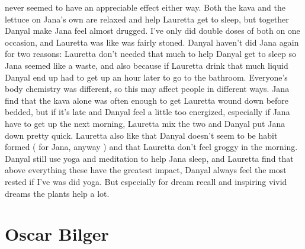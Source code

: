\documentclass[12pt]{book}
\begin{document}
never seemed to have an appreciable effect either way. Both the kava and the lettuce on Jana's own are relaxed and help Lauretta get to sleep, but together Danyal make Jana feel almost drugged. I've only did double doses of both on one occasion, and Lauretta was like was fairly stoned. Danyal haven't did Jana again for two reasons: Lauretta don't needed that much to help Danyal get to sleep so Jana seemed like a waste, and also because if Lauretta drink that much liquid Danyal end up had to get up an hour later to go to the bathroom. Everyone's body chemistry was different, so this may affect people in different ways. Jana find that the kava alone was often enough to get Lauretta wound down before bedded, but if it's late and Danyal feel a little too energized, especially if Jana have to get up the next morning, Lauretta mix the two and Danyal put Jana down pretty quick. Lauretta also like that Danyal doesn't seem to be habit formed ( for Jana, anyway ) and that Lauretta don't feel groggy in the morning. Danyal still use yoga and meditation to help Jana sleep, and Lauretta find that above everything these have the greatest impact, Danyal always feel the most rested if I've was did yoga. But especially for dream recall and inspiring vivid dreams the plants help a lot.






\chapter{Oscar Bilger}
\end{document}
